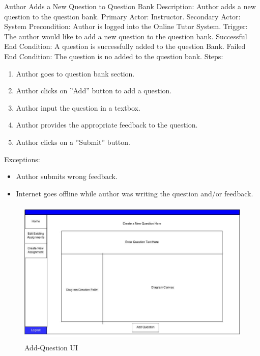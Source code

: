     \begin{section}{Author Adds a New Question to Question Bank}
      Description: Author adds a new question to the question bank. \newline
        Primary Actor: Instructor.  \newline
        Secondary Actor: System  \newline
        Precondition: Author is logged into the Online Tutor System. \newline
        Trigger: The author would like to add a new question to the question bank. \newline
        Successful End Condition: A question is successfully added to the question Bank. \newline
        Failed End Condition: The question is no added to the question bank.
   \newline
        \newline
        Steps:
        \begin{enumerate}
            \item{Author goes to question bank section.}
            \item{Author clicks on ''Add'' button to add a question.}
            \item{Author input the question in a textbox.}
		\item{Author provides the appropriate feedback to the question.}
		\item{Author clicks on a ''Submit'' button.}
        \end{enumerate}
        Exceptions:
        \begin{itemize}
            \item{Author submits wrong feedback.}
	    \item{Internet goes offline while author was writing the question and/or feedback.}
        \end{itemize}
        
                \begin{figure}[H]
            \centerline{\includegraphics[height=7cm]{Add.jpg}}
            \caption{Add-Question UI}
    \end{figure}
    \end{section}
    
